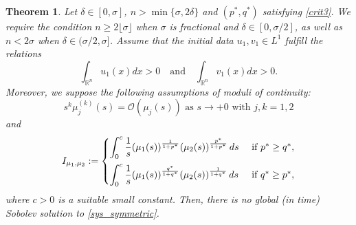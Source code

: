 \documentclass[11pt,reqno]{amsart}
\numberwithin{equation}{section}
\newtheorem{theorem}{Theorem}[section]
\begin{document}
\begin{theorem} \label{thr_blowup}
   Let $\delta \in [0, \sigma]$, $n > \min\{\sigma, 2\delta\}$ and $(p^*,q^*)$ satisfying \eqref{crit3}. We require the condition $n \geq 2\lfloor\sigma\rfloor$ when $\sigma$ is fractional and $\delta \in [0, \sigma/2]$, as well as $n < 2\sigma$ when $\delta \in (\sigma/2, \sigma]$. Assume that the initial data $u_1, v_1 \in L^1$ fulfill the relations
    \begin{equation*}\label{con1thr_blowup}
        \int_{\mathbb{R}^n}u_1(x)dx>0\quad \text{and}\quad \int_{\mathbb{R}^n}v_1(x)dx>0.
    \end{equation*}
    Moreover, we suppose the following assumptions of moduli of continuity:
    \begin{equation*}\label{con2thr_blowup}
        s^{k}\mu^{(k)}_{j}(s)=\mathcal{O}(\mu_j(s))\text{ as }s\to +0\text{ with }j,k=1,2
    \end{equation*}
    and
\[
I_{\mu_1,\mu_2} :=
\begin{cases}
    \vspace{0.2cm}\displaystyle\int_{0}^{c} \frac{1}{s} (\mu_1(s))^{\frac{1}{1+p^*}} (\mu_2(s))^{\frac{p^*}{1+p^*}} \, ds &\text{ if } p^*\ge q^*, \\
    \displaystyle\int_{0}^{c} \frac{1}{s} (\mu_1(s))^{\frac{q^*}{1+q^*}} (\mu_2(s))^{\frac{1}{1+q^*}} \, ds &\text{ if } q^*\ge p^*, \\
\end{cases}
\]
    where $c>0$ is a suitable small constant. Then, there is no global (in time) Sobolev solution to \eqref{sys_symmetric}.
\end{theorem}
\end{document}
